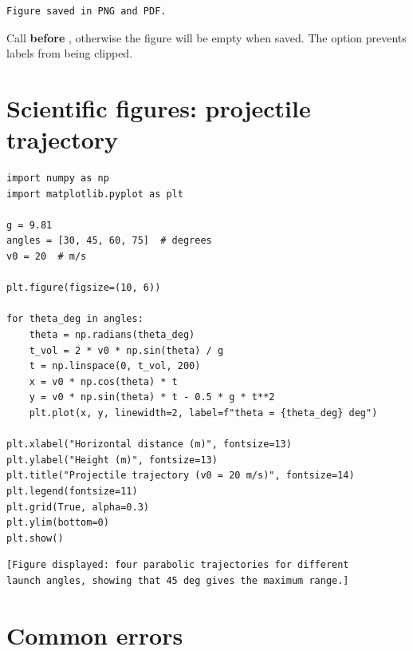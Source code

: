 \begin{codeoutput}
\begin{verbatim}
Figure saved in PNG and PDF.
\end{verbatim}
\end{codeoutput}

\begin{warning}
Call  \textbf{before} , otherwise the figure will be
empty when saved. The option  prevents labels from being
clipped.
\end{warning}

\section{Scientific figures: projectile trajectory}

\begin{codeblock}[title=\textbf{Python}]
\begin{verbatim}
import numpy as np
import matplotlib.pyplot as plt

g = 9.81
angles = [30, 45, 60, 75]  # degrees
v0 = 20  # m/s

plt.figure(figsize=(10, 6))

for theta_deg in angles:
    theta = np.radians(theta_deg)
    t_vol = 2 * v0 * np.sin(theta) / g
    t = np.linspace(0, t_vol, 200)
    x = v0 * np.cos(theta) * t
    y = v0 * np.sin(theta) * t - 0.5 * g * t**2
    plt.plot(x, y, linewidth=2, label=f"theta = {theta_deg} deg")

plt.xlabel("Horizontal distance (m)", fontsize=13)
plt.ylabel("Height (m)", fontsize=13)
plt.title("Projectile trajectory (v0 = 20 m/s)", fontsize=14)
plt.legend(fontsize=11)
plt.grid(True, alpha=0.3)
plt.ylim(bottom=0)
plt.show()
\end{verbatim}
\end{codeblock}

\begin{codeoutput}
\begin{verbatim}
[Figure displayed: four parabolic trajectories for different
launch angles, showing that 45 deg gives the maximum range.]
\end{verbatim}
\end{codeoutput}

\section{Common errors}

